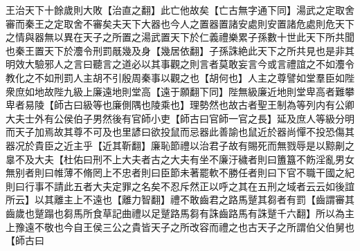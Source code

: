 王治天下十餘歲則大敗【治直之翻】此亡他故矣【亡古無字通下同】湯武之定取舍審而秦王之定取舍不審矣夫天下大器也今人之置器置諸安處則安置諸危處則危天下之情與器無以異在天子之所置之湯武置天下於仁義禮樂累子孫數十世此天下所共聞也秦王置天下於灋令刑罰旤幾及身【幾居依翻】子孫誅絶此天下之所共見也是非其明效大驗邪人之言曰聽言之道必以其事觀之則言者莫敢妄言今或言禮誼之不如灋令教化之不如刑罰人主胡不引殷周秦事以觀之也【胡何也】人主之尊譬如堂羣臣如陛衆庶如地故陛九級上廉遠地則堂高【遠于願翻下同】陛無級廉近地則堂卑高者難攀卑者易陵【師古曰級等也廉側隅也陵乘也】理勢然也故古者聖王制為等列内有公卿大夫士外有公侯伯子男然後有官師小吏【師古曰官師一官之長】延及庶人等級分明而天子加焉故其尊不可及也里諺曰欲投鼠而忌器此善諭也鼠近於器尚憚不投恐傷其器况於貴臣之近主乎【近其靳翻】廉恥節禮以治君子故有賜死而無戮辱是以黥劓之辠不及大夫【杜佑曰刑不上大夫者古之大夫有坐不廉汙穢者則曰簠簋不飭淫亂男女無别者則曰帷薄不脩罔上不忠者則曰臣節未著罷軟不勝任者則曰下官不職干國之紀則曰行事不請此五者大夫定罪之名矣不忍斥然正以呼之其在五刑之域者云云如後誼所云】以其離主上不遠也【離力智翻】禮不敢齒君之路馬蹵其芻者有罰【齒謂審其齒歲也蹵蹋也芻馬所食草記曲禮以足蹵路馬芻有誅齒路馬有誅蹵千六翻】所以為主上豫遠不敬也今自王侯三公之貴皆天子之所改容而禮之也古天子之所謂伯父伯舅也【師古曰